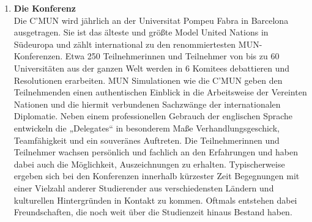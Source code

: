 {\begin{enumerate}
        \item \textbf{Die Konferenz}\\ Die C’MUN wird jährlich an der Universitat Pompeu Fabra in Barcelona ausgetragen. Sie ist das älteste und größte Model United Nations in Südeuropa und zählt international zu den renommiertesten MUN-Konferenzen. Etwa 250 Teilnehmerinnen und Teilnehmer von bis zu 60 Universitäten aus der ganzen Welt werden in 6 Komitees debattieren und Resolutionen erarbeiten. MUN Simulationen wie die C’MUN geben den Teilnehmenden einen authentischen Einblick in die Arbeitsweise der Vereinten Nationen und die hiermit verbundenen Sachzwänge der internationalen Diplomatie. Neben einem professionellen Gebrauch der englischen Sprache entwickeln die „Delegates“ in besonderem Maße Verhandlungsgeschick, Teamfähigkeit und ein souveränes Auftreten. Die Teilnehmerinnen und Teilnehmer wachsen persönlich und fachlich an den Erfahrungen und haben dabei auch die Möglichkeit, Auszeichnungen zu erhalten. Typischerweise ergeben sich bei den Konferenzen innerhalb kürzester Zeit Begegnungen mit einer Vielzahl anderer Studierender aus verschiedensten Ländern und kulturellen Hintergründen in Kontakt zu kommen. Oftmals entstehen dabei Freundschaften, die noch weit über die Studienzeit hinaus Bestand haben.

\end{enumerate}}
